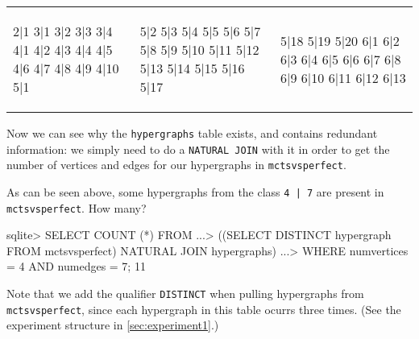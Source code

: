 \begin{tabular}{| p{0.5in} | p{0.5in} | p{0.5in} |}
\begin{minipage}{0.5in}
\begin{output}
2|1
3|1
3|2
3|3
3|4
4|1
4|2
4|3
4|4
4|5
4|6
4|7
4|8
4|9
4|10
5|1
\end{output}
\end{minipage}
&
\begin{minipage}{0.5in}
\begin{output}
5|2
5|3
5|4
5|5
5|6
5|7
5|8
5|9
5|10
5|11
5|12
5|13
5|14
5|15
5|16
5|17
\end{output}
\end{minipage}
&
\begin{minipage}{0.5in}
\begin{output}
5|18
5|19
5|20
6|1
6|2
6|3
6|4
6|5
6|6
6|7
6|8
6|9
6|10
6|11
6|12
6|13
\end{output}
\end{minipage}
\\
\end{tabular}

Now we can see why the \texttt{hypergraphs} table exists, and contains redundant information: we simply need to do a \texttt{NATURAL JOIN} with it in order to get the number of vertices and edges for our hypergraphs in \texttt{mctsvsperfect}.

As can be seen above, some hypergraphs from the class \texttt{4 | 7} are present in \texttt{mctsvsperfect}. How many?
\begin{code}
sqlite> SELECT COUNT (*) FROM
   ...> ((SELECT DISTINCT hypergraph FROM mctsvsperfect) NATURAL JOIN hypergraphs)
   ...> WHERE numvertices = 4 AND numedges = 7;
11
\end{code}
Note that we add the qualifier \texttt{DISTINCT} when pulling hypergraphs from \texttt{mctsvsperfect}, since each hypergraph in this table ocurrs three times. (See the experiment structure in \ref{sec:experiment1}.)

